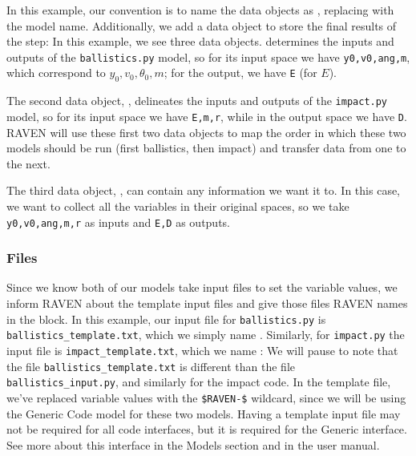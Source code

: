 In this
example, our convention is to name the  data objects as , replacing
 with the model name.  Additionally, we add a data object to store the final results of the
 step:
In this example, we see three data objects.   determines the inputs and outputs of the
\texttt{ballistics.py} model, so for its input space we have \texttt{y0,v0,ang,m}, which correspond to
$y_0,v_0,\theta_0,m$; for the output, we have \texttt{E} (for $E$).

The second data object, , delineates the inputs and outputs of the \texttt{impact.py}
model, so for its input space we have \texttt{E,m,r}, while in the output space we have \texttt{D}.  RAVEN
will use these first two data objects to map the order in which these two models should be run (first
ballistics, then impact) and transfer data from one to the next.

The third data object, , can contain any information we want it to.  In this case,
we want to collect all the variables in their original spaces, so we take \texttt{y0,v0,ang,m,r} as inputs and
\texttt{E,D} as outputs.


\subsubsection{Files}
Since we know both of our models take input files to set the variable values, we inform RAVEN about the
template input files and
give those files RAVEN names in the  block.  In this example, our input file for \texttt{ballistics.py} is
\texttt{ballistics\_template.txt}, which we simply name .  Similarly,
for \texttt{impact.py} the input file is \texttt{impact\_template.txt}, which we name
:
We will pause to note that the file \texttt{ballistics\_template.txt} is different than the file
\texttt{ballistics\_input.py}, and similarly for the impact code.  In the template file, we've replaced
variable values with the \texttt{\$RAVEN-\$} wildcard, since we will be using the Generic Code model for these
two models.  Having a template input file may not be required for all code interfaces, but it is required for
the Generic interface. See more about this interface in the Models section and in the user manual.


